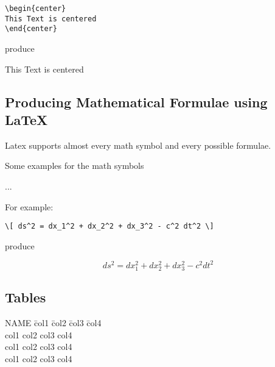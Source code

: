 \begin{verbatim}
\begin{center}
This Text is centered
\end{center}
\end{verbatim}

produce 

\begin{center}
This Text is centered
\end{center}


\subsection{Producing Mathematical Formulae using \LaTeX}

Latex supports almost every math symbol and every possible formulae.

Some examples for the math symbols

... 


For example:

\begin{verbatim}
\[ ds^2 = dx_1^2 + dx_2^2 + dx_3^2 - c^2 dt^2 \]
\end{verbatim}

produce 

\[ ds^2 = dx_1^2 + dx_2^2 + dx_3^2 - c^2 dt^2 \]





\subsection{Tables}

\begin{tabbing}
\textsc{NAME} \=col1 \=col2 \=col3 \=col4 \\
\>col1 \>col2 \>col3 \>col4 \\
\>col1 \>col2 \>col3 \>col4 \\
\>col1 \>col2 \>col3 \>col4 \\
\end{tabbing}


